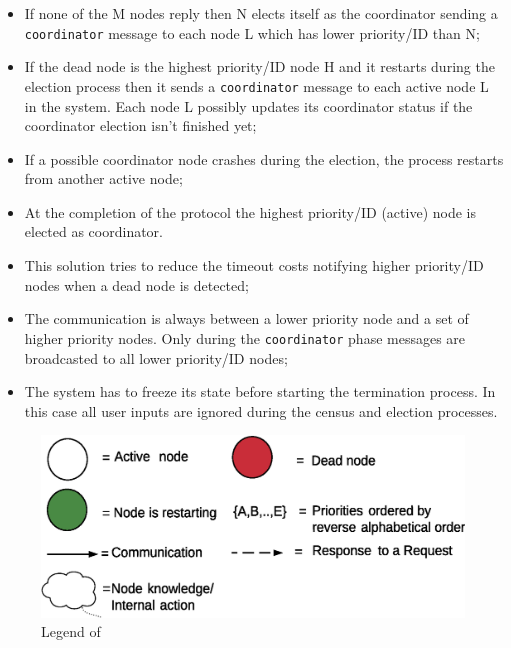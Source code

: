\begin{itemize}
\item If none of the M nodes reply then N elects itself as the coordinator
  sending a \texttt{coordinator} message to each node L which has lower
  priority/ID than N;
\item If the dead node is the highest priority/ID node H and it restarts
  during the election process then it sends a \texttt{coordinator} message to
  each active node L in the system. Each node L possibly updates its
  coordinator status if the coordinator election isn't finished yet;
\item If a possible coordinator node crashes during the election, the process
  restarts from another active node;
\item At the completion of the protocol the highest priority/ID (active) node
  is elected as coordinator.
\item This solution tries to reduce the timeout costs notifying higher
  priority/ID nodes when a dead node is detected;
\item The communication is always between a lower priority node and a set of
  higher priority nodes. Only during the \texttt{coordinator} phase messages
  are broadcasted to all lower priority/ID nodes;
\item The system has to freeze its state before starting the termination
  process. In this case all user inputs are ignored during the census and
  election processes.
\end{itemize}


\begin{figure}[H]
  \centering
  \includegraphics[width=.6\columnwidth]{images/solution/election_legend.eps}
  \caption{Legend of }
  \label{fig:election-protocol-legend}
\end{figure}

